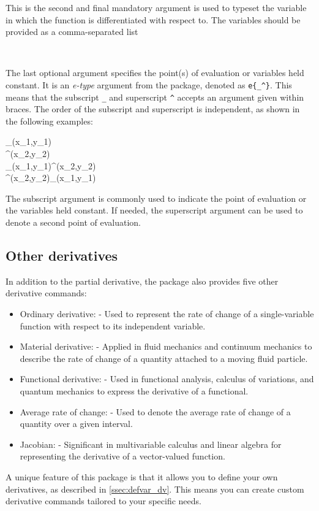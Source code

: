 \begin{function}
	\begin{argument}{6}
		This is the second and final mandatory argument is used to typeset the variable in which the function is differentiated with respect to. The variables should be provided as a comma-separated list
		\begin{example}
			 \\
		\end{example}
	\end{argument}
	
	\begin{argument}{7}
		The last optional argument specifies the point(s) of evaluation or variables held constant. It is an \emph{e-type} argument from the  package, denoted as \verb|e{_^}|. This means that the subscript \verb|_| and superscript \verb|^| accepts an argument given within braces. The order of the subscript and superscript is independent, as shown in the following examples:
		\begin{example}
			_{(x_1,y_1)} \\
			^{(x_2,y_2)} \\
			_{(x_1,y_1)}^{(x_2,y_2)} \\
			^{(x_2,y_2)}_{(x_1,y_1)}
		\end{example}
		The subscript argument is commonly used to indicate the point of evaluation or the variables held constant. If needed, the superscript argument can be used to denote a second point of evaluation.
	\end{argument}
	
\end{function}

\subsection{Other derivatives}
In addition to the partial derivative, the package also provides five other derivative commands:
\begin{itemize}
	\item Ordinary derivative: \macro{\odv} - Used to represent the rate of change of a single-variable function with respect to its independent variable.
	\item Material derivative: \macro{\mdv} - Applied in fluid mechanics and continuum mechanics to describe the rate of change of a quantity attached to a moving fluid particle.
	\item Functional derivative: \macro{\fdv} - Used in functional analysis, calculus of variations, and quantum mechanics to express the derivative of a functional.
	\item Average rate of change: \macro{\adv} - Used to denote the average rate of change of a quantity over a given interval.
	\item Jacobian: \macro{\jdv} - Significant in multivariable calculus and linear algebra for representing the derivative of a vector-valued function.
\end{itemize}
A unique feature of this package is that it allows you to define your own derivatives, as described in \cref{ssec:defvar_dv}. This means you can create custom derivative commands tailored to your specific needs.

